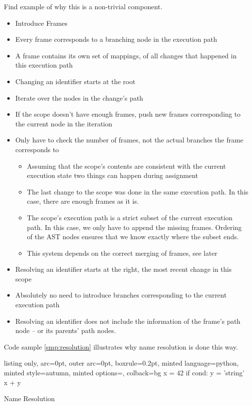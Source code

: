 \documentclass[]{article}
\providecommand{\tightlist}{%
  \setlength{\itemsep}{0pt}\setlength{\parskip}{0pt}}
\begin{document}
Find example of why this is a non-trivial component.

\begin{itemize}
\item
  Introduce Frames
\item
  Every frame corresponds to a branching node in the execution path
\item
  A frame contains its own set of mappings, of all changes that happened
  in this execution path
\item
  Changing an identifier starts at the root
\item
  Iterate over the nodes in the change's path
\item
  If the scope doesn't have enough frames, push new frames corresponding
  to the current node in the iteration
\item
  Only have to check the number of frames, not the actual branches the
  frame corresponds to

  \begin{itemize}
  \tightlist
  \item
    Assuming that the scope's contents are consistent with the current
    execution state two things can happen during assignment
  \item
    The last change to the scope was done in the same execution path. In
    this case, there are enough frames as it is.
  \item
    The scope's execution path is a strict subset of the current
    execution path. In this case, we only have to append the missing
    frames. Ordering of the AST nodes ensures that we know exactly where
    the subset ends.
  \item
    This system depends on the correct merging of frames, see later
  \end{itemize}
\item
  Resolving an identifier starts at the right, the most recent change in
  this scope
\item
  Absolutely no need to introduce branches corresponding to the current
  execution path
\item
  Resolving an identifier does not include the information of the
  frame's path node -- or its parents' path nodes.
\end{itemize}

Code sample \ref{smp:resolution} illustrates why name resolution is done
this way.

\begin{code}
  \begin{tcblisting}{listing only, 
  arc=0pt,
  outer arc=0pt, 
  boxrule=0.2pt,
  minted language=python,
  minted style=autumn,
  minted options={},
  colback=bg }
x = 42
if cond:
  y = 'string'
  x + y
\end{tcblisting}
\caption{Name Resolution}\label{smp:resolution}

\end{code}
\end{document}

